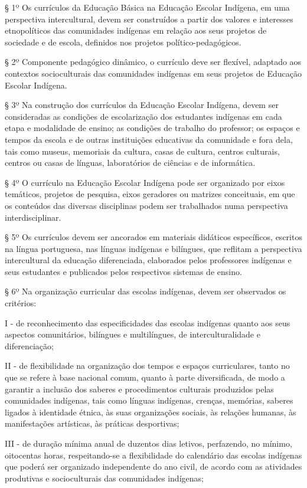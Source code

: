 \documentclass[
]{book}
\begin{document}
§ 1º Os currículos da Educação Básica na Educação Escolar Indígena, em uma perspectiva intercultural, devem ser construídos a partir dos valores e interesses etnopolíticos das comunidades indígenas em relação aos seus projetos de sociedade e de escola, definidos nos projetos político-pedagógicos.

§ 2º Componente pedagógico dinâmico, o currículo deve ser flexível, adaptado aos contextos socioculturais das comunidades indígenas em seus projetos de Educação Escolar Indígena.

§ 3º Na construção dos currículos da Educação Escolar Indígena, devem ser consideradas as condições de escolarização dos estudantes indígenas em cada etapa e modalidade de ensino; as condições de trabalho do professor; os espaços e tempos da escola e de outras instituições educativas da comunidade e fora dela, tais como museus, memoriais da cultura, casas de cultura, centros culturais, centros ou casas de línguas, laboratórios de ciências e de informática.

§ 4º O currículo na Educação Escolar Indígena pode ser organizado por eixos temáticos, projetos de pesquisa, eixos geradores ou matrizes conceituais, em que os conteúdos das diversas disciplinas podem ser trabalhados numa perspectiva interdisciplinar.

§ 5º Os currículos devem ser ancorados em materiais didáticos específicos, escritos na língua portuguesa, nas línguas indígenas e bilíngues, que reflitam a perspectiva intercultural da educação diferenciada, elaborados pelos professores indígenas e seus estudantes e publicados pelos respectivos sistemas de ensino.

§ 6º Na organização curricular das escolas indígenas, devem ser observados os critérios:

I - de reconhecimento das especificidades das escolas indígenas quanto aos seus aspectos comunitários, bilíngues e multilíngues, de interculturalidade e diferenciação;

II - de flexibilidade na organização dos tempos e espaços curriculares, tanto no que se refere à base nacional comum, quanto à parte diversificada, de modo a garantir a inclusão dos saberes e procedimentos culturais produzidos pelas comunidades indígenas, tais como línguas indígenas, crenças, memórias, saberes ligados à identidade étnica, às suas organizações sociais, às relações humanas, às manifestações artísticas, às práticas desportivas;

III - de duração mínima anual de duzentos dias letivos, perfazendo, no mínimo, oitocentas horas, respeitando-se a flexibilidade do calendário das escolas indígenas que poderá ser organizado independente do ano civil, de acordo com as atividades produtivas e socioculturais das comunidades indígenas;
\end{document}
